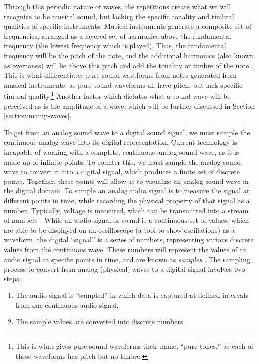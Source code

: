 Through this periodic nature of waves, the repetitions create what we will recognize to be musical sound, but lacking the specific tonality and timbral qualities of specific instruments. Musical instruments generate a composite set of frequencies, arranged as a layered set of harmonics above the fundamental frequency (the lowest frequency which is played). Thus, the fundamental frequency will be the pitch of the note, and the additional harmonics (also known as overtones) will lie above this pitch and add the tonality or timbre of the note \cite{Toft_2020}. This is what differentiates pure sound waveforms from notes generated from musical instruments, as pure sound waveforms all have pitch, but lack specific timbral quality.\footnote{This is what gives pure sound waveforms their name, ``pure tones,'' as each of these waveforms has pitch but no timbre.} Another factor which dictates what a sound wave will be perceived as is the amplitude of a wave, which will be further discussed in Section \ref{section:manip-waves}.

To get from an analog sound wave to a digital sound signal, we must sample the continuous analog wave into its digital representation. Current technology is incapable of working with a complete, continuous analog sound wave, as it is made up of infinite points. To counter this, we must sample the analog sound wave to convert it into a digital signal, which produces a finite set of discrete points. Together, these points will allow us to visualize an analog sound wave in the digital domain. To sample an analog audio signal is to measure the signal at different points in time, while recording the physical property of that signal as a number. Typically, voltage is measured, which can be transmitted into a stream of numbers \cite{Anderson}. While an audio signal or sound is a continuous set of values, which are able to be displayed on an oscilloscope (a tool to show oscillations) as a waveform, the digital ``signal'' is a series of numbers, representing various discrete values from the continuous wave. These numbers will represent the values of an audio signal at specific points in time, and are known as \textit{samples} \cite{Russ_2012}. The sampling process to convert from analog (physical) waves to a digital signal involves two steps:

\begin{enumerate}
	\item The audio signal is ``sampled'' in which data is captured at defined intervals from one continuous audio signal.
	\item The sample values are converted into discrete numbers.
\end{enumerate}

